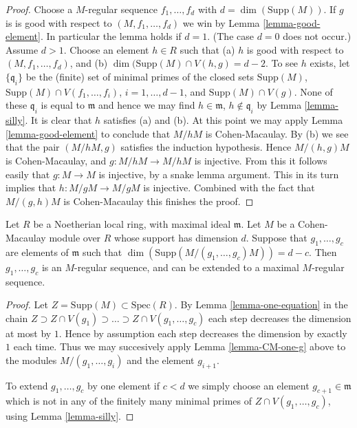 \begin{proof}
Choose a $M$-regular sequence $f_1,\ldots,f_d$ with
$d = \dim(\text{Supp}(M))$. If $g$ is is good with respect to
$(M, f_1,\ldots,f_d)$ we win by Lemma \ref{lemma-good-element}.
In particular the lemma holds if $d = 1$. (The case $d = 0$ does
not occur.) Assume $d > 1$. Choose an element $h \in R$ such that
(a) $h$ is good with respect to $(M, f_1,\ldots,f_d)$,
and (b) $\dim( \text{Supp}(M) \cap V(h, g) = d - 2$.
To see $h$ exists, let $\{\mathfrak q_i\}$ be the (finite) set of
minimal primes of the closed sets $\text{Supp}(M)$,
$\text{Supp}(M)\cap V(f_1,\ldots,f_i)$, $i=1,\ldots, d-1$,
and $\text{Supp}(M) \cap V(g)$. None of these $\mathfrak q_i$
is equal to $\mathfrak m$ and hence we may find $h \in \mathfrak m$,
$h \not \in \mathfrak q_i$ by Lemma \ref{lemma-silly}. It is clear
that $h$ satisfies (a) and (b). At this point we may
apply Lemma \ref{lemma-good-element} to conclude that
$M/hM$ is Cohen-Macaulay. By (b) we see that the pair
$(M/hM, g)$ satisfies the induction hypothesis. Hence
$M/(h,g)M$ is Cohen-Macaulay, and $g : M/hM \to M/hM$
is injective. From this it follows easily that
$g : M \to M$ is injective, by a snake lemma argument.
This in its turn implies that $h : M/gM \to M/gM$
is injective. Combined with the fact that $M/(g,h)M$
is Cohen-Macaulay this finishes the proof.
\end{proof}

\begin{proposition}
\label{proposition-CM-module}
Let $R$ be a Noetherian local ring, with maximal ideal $\mathfrak m$.
Let $M$ be a Cohen-Macaulay module over $R$ whose support has dimension $d$.
Suppose that $g_1,\ldots,g_c$ are elements of
$\mathfrak m$ such that $\dim(\text{Supp}(M/(g_1,\ldots,g_c)M))
= d - c$. Then $g_1,\ldots,g_c$ is an $M$-regular sequence,
and can be extended to a maximal $M$-regular sequence.
\end{proposition}

\begin{proof}
Let $Z = \text{Supp}(M) \subset \text{Spec}(R)$.
By Lemma \ref{lemma-one-equation} in the chain
$Z \supset Z \cap V(g_1) \supset \ldots \supset Z \cap V(g_1,\ldots,g_c)$
each step decreases the dimension at most by $1$. Hence by assumption
each step decreases the dimension by exactly $1$ each time. Thus we 
may succesively apply Lemma \ref{lemma-CM-one-g} above to the modules
$M/(g_1,\ldots,g_i)$ and the element $g_{i+1}$.

\medskip\noindent
To extend $g_1,\ldots,g_c$ by one element if $c < d$ we simply
choose an element $g_{c+1} \in \mathfrak m$ which is not
in any of the finitely many minimal primes of $Z \cap V(g_1,\ldots,g_c)$,
using Lemma \ref{lemma-silly}.
\end{proof}












